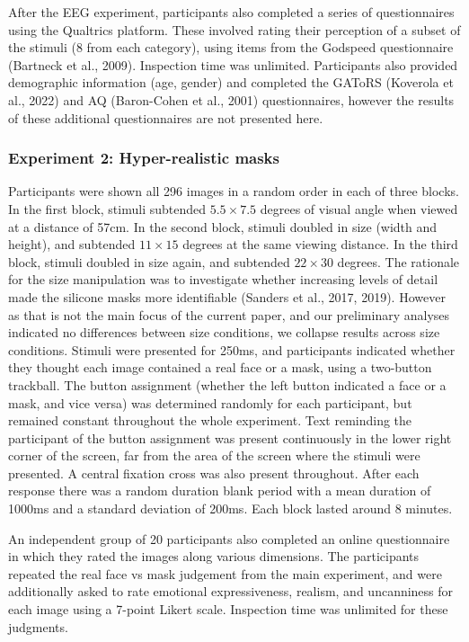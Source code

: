 \documentclass[
]{article}
\begin{document}
After the EEG experiment, participants also completed a series of questionnaires using the Qualtrics platform. These involved rating their perception of a subset of the stimuli (8 from each category), using items from the Godspeed questionnaire (Bartneck et al., 2009). Inspection time was unlimited. Participants also provided demographic information (age, gender) and completed the GAToRS (Koverola et al., 2022) and AQ (Baron-Cohen et al., 2001) questionnaires, however the results of these additional questionnaires are not presented here.

\subsubsection{Experiment 2: Hyper-realistic masks}\label{experiment-2-hyper-realistic-masks}

Participants were shown all 296 images in a random order in each of three blocks. In the first block, stimuli subtended \(5.5\times7.5\) degrees of visual angle when viewed at a distance of 57cm. In the second block, stimuli doubled in size (width and height), and subtended \(11\times15\) degrees at the same viewing distance. In the third block, stimuli doubled in size again, and subtended \(22\times30\) degrees. The rationale for the size manipulation was to investigate whether increasing levels of detail made the silicone masks more identifiable (Sanders et al., 2017, 2019). However as that is not the main focus of the current paper, and our preliminary analyses indicated no differences between size conditions, we collapse results across size conditions. Stimuli were presented for 250ms, and participants indicated whether they thought each image contained a real face or a mask, using a two-button trackball. The button assignment (whether the left button indicated a face or a mask, and vice versa) was determined randomly for each participant, but remained constant throughout the whole experiment. Text reminding the participant of the button assignment was present continuously in the lower right corner of the screen, far from the area of the screen where the stimuli were presented. A central fixation cross was also present throughout. After each response there was a random duration blank period with a mean duration of 1000ms and a standard deviation of 200ms. Each block lasted around 8 minutes.

An independent group of 20 participants also completed an online questionnaire in which they rated the images along various dimensions. The participants repeated the real face vs mask judgement from the main experiment, and were additionally asked to rate emotional expressiveness, realism, and uncanniness for each image using a 7-point Likert scale. Inspection time was unlimited for these judgments.
\end{document}
